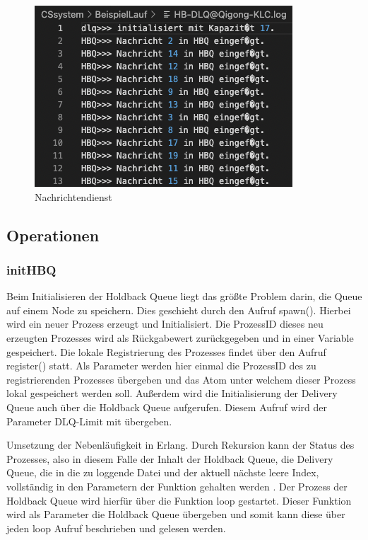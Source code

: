 \begin{figure}[htbp]
\begin{center}
\includegraphics[scale=0.6]{Bilder/HBQFilesEntry.png}
\caption{\label{fig:HBQFilesEntry} Nachrichtendienst \cite{HBQlogging}} 
\end{center}
\end{figure}

\subsection{Operationen}

\subsubsection{initHBQ}

Beim Initialisieren der Holdback Queue liegt das größte Problem darin, die Queue auf einem Node zu speichern. Dies geschieht durch den Aufruf spawn(). Hierbei wird ein neuer Prozess erzeugt und Initialisiert. Die ProzessID dieses neu erzeugten Prozesses wird als Rückgabewert zurückgegeben und in einer Variable gespeichert. 
Die lokale Registrierung des Prozesses findet über den Aufruf register() statt. Als Parameter werden hier einmal die ProzessID des zu registrierenden Prozesses übergeben und das Atom unter welchem dieser Prozess lokal gespeichert werden soll. 
Außerdem wird die Initialisierung der Delivery Queue auch über die Holdback Queue aufgerufen. Diesem Aufruf wird der Parameter DLQ-Limit mit übergeben. 

Umsetzung der Nebenläufigkeit in Erlang. Durch Rekursion kann der Status des Prozesses, also in diesem Falle der Inhalt der Holdback Queue, die Delivery Queue, die in die zu loggende Datei und der aktuell nächste leere Index, vollständig in den Parametern der Funktion gehalten werden \cite{learnErlang}. Der Prozess der Holdback Queue wird hierfür über die Funktion loop gestartet. Dieser Funktion wird als Parameter die Holdback Queue übergeben und somit kann diese über jeden loop Aufruf beschrieben und gelesen werden. 

